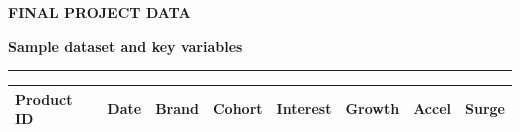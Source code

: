 \documentclass[aspectratio=169, 10pt]{beamer}
\newcommand{\slideheader}[3]{%
        \vspace{-0.25cm}%
        \noindent\begin{minipage}[t]{0.88\linewidth}%
            {\fontsize{7pt}{8.5pt}\selectfont \textbf{\color{BlueAccent}#1}}\par\vspace{1pt}%
            {\fontsize{11.5pt}{13.5pt}\selectfont \textbf{\color{NavyPrimary}#2}}%
        \end{minipage}%
        \hfill%
        \begin{minipage}[t]{0.10\linewidth}%
            \raggedleft{\fontsize{12pt}{14pt}\selectfont \textbf{\color{CoralAccent}#3}}%
        \end{minipage}\par%
        \vspace{2pt}%
        \textcolor{CardBorder}{\rule{\linewidth}{0.6pt}}\par%
        \vspace{3pt}%
    }
\begin{document}
    \begin{frame}[t]                                                                                                                                                                                   
        \slideheader{FINAL PROJECT DATA}{Sample dataset and key variables}{05}                                                                                                                         
        \vspace{-0.1cm}                                                                                                                                                                                
        \begin{table}[h]                                                                                                                                                                               
            \centering\scriptsize                                                                                                                                                                      
            \begin{tabular}{llcccccc}                                                                                                                                                                 
                \toprule                                                                                                                                                                               
                \rowcolor{NavyPrimary!15} \textbf{Product ID} & \textbf{Date} & \textbf{Brand} & \textbf{Cohort} & \textbf{Interest} & \textbf{Growth} & \textbf{Accel} & \textbf{Surge} \\                                                                                                                                                                                 
                \midrule                                                                                                                                                                               

\end{tabular}
\end{table}
\end{frame}
\end{document}
